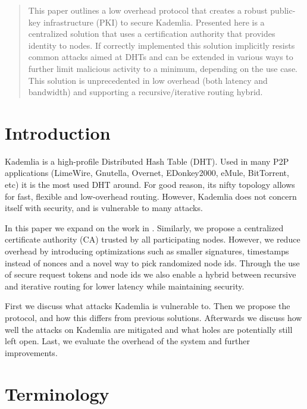\documentclass[12pt]{article}
\begin{document}
\maketitle

\begin{abstract}
\noindent This paper outlines a low overhead protocol that creates a
robust public-key infrastructure (PKI) to secure Kademlia.  Presented here is a
centralized solution that uses a certification authority that provides identity
to nodes. If correctly implemented this solution implicitly resists common
attacks aimed at DHTs and can be extended in various ways to further limit
malicious activity to a minimum, depending on the use case.  This solution is
unprecedented in low overhead (both latency and bandwidth) and supporting a
recursive/iterative routing hybrid.
\end{abstract}

\section{Introduction}\label{introduction} Kademlia \cite{kademlia} is a
high-profile Distributed Hash Table (DHT). Used in many P2P applications
(LimeWire, Gnutella, Overnet, EDonkey2000, eMule, BitTorrent, etc) it is the
most used DHT around. For good reason, its nifty topology allows for fast,
flexible and low-overhead routing. However, Kademlia does not concern itself
with security, and is vulnerable to many attacks.

In this paper we expand on the work in \cite{aiello2008tempering}. Similarly,
we propose a centralized certificate authority (CA) trusted by all
participating nodes. However, we reduce overhead by introducing optimizations
such as smaller signatures, timestamps instead of nonces and a novel way to
pick randomized node ids. Through the use of secure request tokens and node ids
we also enable a hybrid between recursive and iterative routing for lower
latency while maintaining security.

First we discuss what attacks Kademlia is vulnerable to. Then we propose the
protocol, and how this differs from previous solutions. Afterwards we discuss
how well the attacks on Kademlia are mitigated and what holes are potentially
still left open. Last, we evaluate the overhead of the system and further
improvements.

\section{Terminology}\label{terminology}
\end{document}
